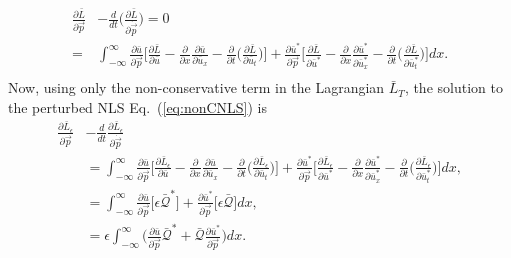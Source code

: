 \begin{align}
 \frac{\partial \bar{L}}{\partial \vec{p}} &- \frac{d}{dt} \Bigg(\frac{\partial \bar{L}}{\partial \dot{\vec{p}}}\Bigg) = 0   \nonumber \\
 =& \int_{-\infty}^{\infty} \frac{\partial \bar{u}}{\partial \vec{p}} \Bigg[ \frac{\partial \bar{L}}{\partial \bar{u}} - \frac{\partial }{\partial x}\frac{\partial \bar{u}}{\partial \bar{u}_x} - \frac{\partial}{\partial t} \Big( \frac{\partial \bar{L}}{\partial \bar{u}_t} \Big) \Bigg]  + \frac{\partial \bar{u}^*}{\partial \vec{p}} \Bigg[\frac{\partial \bar{L}}{\partial \bar{u}^*} - \frac{\partial }{\partial x}\frac{\partial \bar{u}^*}{\partial \bar{u}_x^*} - \frac{\partial}{\partial t} \Big( \frac{\partial \bar{L}}{\partial \bar{u}_t^*} \Big) \Bigg] dx. \nonumber \\
\end{align}
Now, using only the non-conservative term in the Lagrangian $\bar{L}_T$, the solution to the perturbed NLS Eq.~(\ref{eq:nonCNLS}) is 
\begin{align} 
 \frac{\partial \bar{L}_{\epsilon}}{\partial \vec{p}} &- \frac{d}{dt} \frac{\partial \bar{L}_{\epsilon}}{\partial \dot{\vec{p}}}    \nonumber \\
 &= \int_{-\infty}^{\infty} \frac{\partial \bar{u}}{\partial \vec{p}} \Bigg[ \frac{\partial \bar{L}_{\epsilon}}{\partial \bar{u}} - \frac{\partial }{\partial x}\frac{\partial \bar{u}}{\partial \bar{u}_x} - \frac{\partial}{\partial t} \Big( \frac{\partial \bar{L}_{\epsilon}}{\partial \bar{u}_t} \Big) \Bigg]  + \frac{\partial \bar{u}^*}{\partial \vec{p}} \Bigg[\frac{\partial \bar{L}_{\epsilon}}{\partial \bar{u}^*} - \frac{\partial }{\partial x}\frac{\partial \bar{u}^*}{\partial \bar{u}_x^*} - \frac{\partial}{\partial t} \Big( \frac{\partial \bar{L}_{\epsilon}}{\partial \bar{u}_t^*} \Big) \Bigg] dx, \nonumber \\
  &= \int_{-\infty}^{\infty} \frac{\partial \bar{u}}{\partial \vec{p}} \Bigg[  \epsilon \bar{\mathcal{Q}}^* \Bigg]  + \frac{\partial \bar{u}^*}{\partial \vec{p}} \Bigg[ \epsilon \bar{\mathcal{Q} }\Bigg] dx, \nonumber \\
 &= \epsilon \int_{-\infty}^{\infty} \Big( \frac{\partial \bar{u}}{\partial \vec{p}} \bar{ \mathcal{Q}}^* + \bar{\mathcal{Q}} \frac{\partial \bar{u}^*}{\partial \vec{p}} \Big)dx. \nonumber
\end{align}

